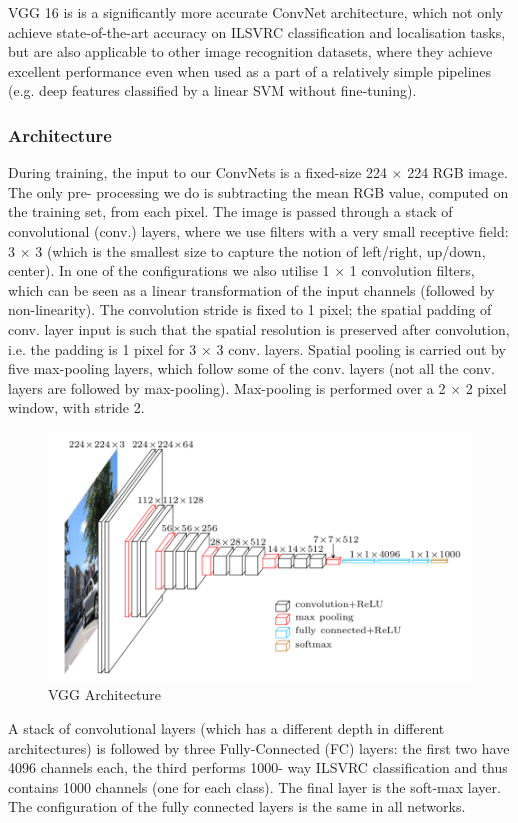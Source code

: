 \documentclass[11pt]{article}
\begin{document}
	VGG 16 is is a significantly more accurate ConvNet architecture, which not
	only achieve state-of-the-art accuracy on ILSVRC classification and
	localisation tasks, but are also applicable to other image recognition
	datasets, where they achieve excellent performance even when used as a part
	of a relatively simple pipelines (e.g. deep features classified by a linear
	SVM without fine-tuning).

	\subsubsection{Architecture}
	\label{sssec:vgg arch}

	During training, the input to our ConvNets is a fixed-size 224 × 224 RGB
	image. The only pre- processing we do is subtracting the mean RGB value,
	computed on the training set, from each pixel.  The image is passed through
	a stack of convolutional (conv.) layers, where we use filters with a very
	small receptive field: 3 × 3 (which is the smallest size to capture the
	notion of left/right, up/down, center). In one of the configurations we also
	utilise 1 × 1 convolution filters, which can be seen as a linear
	transformation of the input channels (followed by non-linearity). The
	convolution stride is fixed to 1 pixel; the spatial padding of conv. layer
	input is such that the spatial resolution is preserved after convolution,
	i.e. the padding is 1 pixel for 3 × 3 conv. layers. Spatial pooling is
	carried out by five max-pooling layers, which follow some of the conv.
	layers (not all the conv. layers are followed by max-pooling). Max-pooling
	is performed over a 2 × 2 pixel window, with stride 2.

	\begin{figure}[h]
		\centering
		\includegraphics[width=0.5\linewidth]{imgs/vgg16_arch.png}
		\caption{VGG Architecture}%
		\label{fig:vgg_arch}
	\end{figure}

	A stack of convolutional layers (which has a different depth in different
	architectures) is followed by three Fully-Connected (FC) layers: the first
	two have 4096 channels each, the third performs 1000- way ILSVRC
	classification and thus contains 1000 channels (one for each class). The
	final layer is the soft-max layer. The configuration of the fully connected
	layers is the same in all networks.
\end{document}
